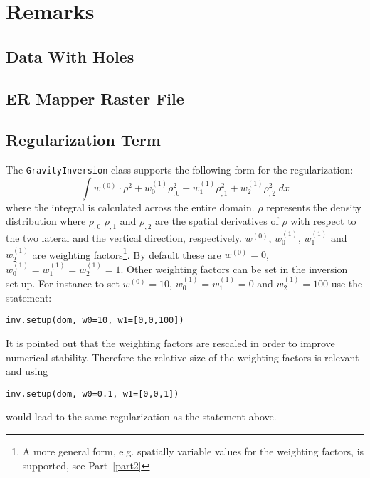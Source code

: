 \section{Remarks}

\subsection{Data With Holes}\label{SEC:P1:GRAV:REMARK:DATAHOLES}


\subsection{ER Mapper Raster File}\label{SEC:P1:GRAV:REMARK:ERMAPPER}

\subsection{Regularization Term}\label{SEC:P1:GRAV:REMARK:REG}
The \verb|GravityInversion| class supports the following form for the
regularization:
\begin{equation}
\int w^{(0)} \cdot \rho^2 + w^{(1)}_0  \rho_{,0}^2 +  w^{(1)}_1  \rho_{,1}^2 +  w^{(1)}_2  \rho_{,2}^2\; dx   
\end{equation}
where the integral is calculated across the entire domain.
$\rho$ represents the density distribution where $\rho_{,0}$ $\rho_{,1}$ and
$\rho_{,2}$ are the spatial derivatives of $\rho$ with respect to the two
lateral and the vertical direction, respectively.
$w^{(0)}$, $w^{(1)}_0$, $w^{(1)}_1$ and $w^{(1)}_2$ are weighting
factors\footnote{A more general form, e.g. spatially variable values for the
weighting factors, is supported, see Part~\ref{part2}}.
By default these are $w^{(0)}=0$, $w^{(1)}_0=w^{(1)}_1=w^{(1)}_2=1$.
Other weighting factors can be set in the inversion set-up.
For instance to set $w^{(0)}=10$, $w^{(1)}_0=w^{(1)}_1=0$ and $w^{(1)}_2=100$
use the statement:
\begin{verbatim}
inv.setup(dom, w0=10, w1=[0,0,100])
\end{verbatim}
It is pointed out that the weighting factors are rescaled in order to improve
numerical stability. Therefore the relative size of the weighting factors is
relevant and using
\begin{verbatim}
inv.setup(dom, w0=0.1, w1=[0,0,1])
\end{verbatim}
would lead to the same regularization as the statement above.

